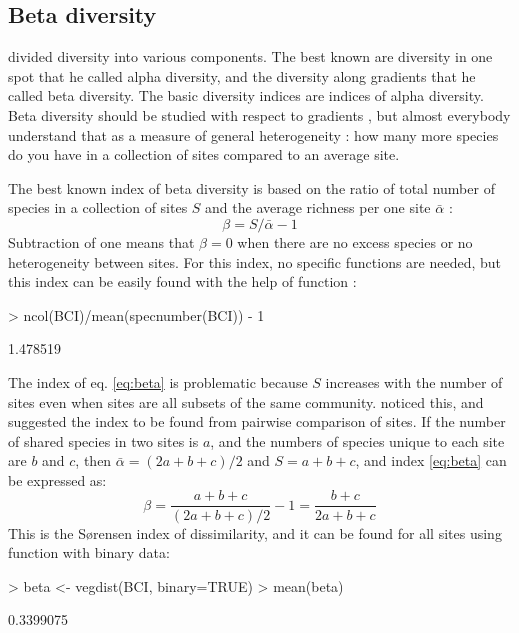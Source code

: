 \documentclass[a4paper,10pt,twocolumn]{article}
\begin{document}
\subsection{Beta diversity}

\citet{Whittaker60} divided diversity into various components. The
best known are diversity in one spot that he called alpha diversity,
and the diversity along gradients that he called beta diversity. The
basic diversity indices are indices of alpha diversity. Beta diversity
should be studied with respect to gradients \citep{Whittaker60}, but
almost everybody understand that as a measure of general heterogeneity
\citep{Tuomisto10a, Tuomisto10b}: how many more species do you have in
a collection of sites compared to an average site.

The best known index of beta diversity is based on the ratio of total
number of species in a collection of sites $S$ and the average
richness per one site $\bar \alpha$ \citep{Tuomisto10a}:
\begin{equation}
  \label{eq:beta}
  \beta = S/\bar \alpha - 1
\end{equation}
Subtraction of one means that $\beta = 0$ when there are no excess
species or no heterogeneity between sites. For this index, no specific
functions are needed, but this index can be easily found with the help
of  function :
\begin{Schunk}
\begin{Sinput}
> ncol(BCI)/mean(specnumber(BCI)) - 1
\end{Sinput}
\begin{Soutput}
[1] 1.478519
\end{Soutput}
\end{Schunk}

The index of eq. \ref{eq:beta} is problematic because $S$ increases
with the number of sites even when sites are all subsets of the same
community.  \citet{Whittaker60} noticed this, and suggested the index
to be found from pairwise comparison of sites. If the number of shared
species in two sites is $a$, and the numbers of species unique to each
site are $b$ and $c$, then $\bar \alpha = (2a + b + c)/2$ and $S =
a+b+c$, and index \ref{eq:beta} can be expressed as:
\begin{equation}
  \label{eq:betabray}
  \beta = \frac{a+b+c}{(2a+b+c)/2} - 1 = \frac{b+c}{2a+b+c}
\end{equation}
This is the S{\o}rensen index of dissimilarity, and it can be found
for all sites using  function  with
binary data:
\begin{Schunk}
\begin{Sinput}
> beta <- vegdist(BCI, binary=TRUE)
> mean(beta)
\end{Sinput}
\begin{Soutput}
[1] 0.3399075
\end{Soutput}
\end{Schunk}
\end{document}
